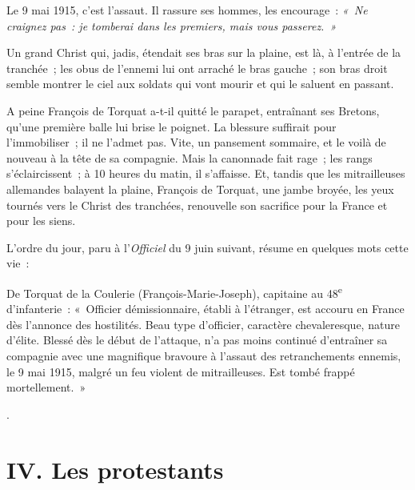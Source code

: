 \documentclass[french,twoside]{book} %
\newcommand\chapteropen{} %
\newcommand\chapterclose{} %
\begin{document}
{ Le 9 mai 1915, c’est l’assaut. Il rassure ses hommes, les encourage : \emph{« Ne craignez pas : je tomberai dans les premiers, mais vous passerez. »}‌\par
 Un grand Christ qui, jadis, étendait ses bras sur la plaine, est là, à l’entrée de la tranchée ; les obus de l’ennemi lui ont arraché le bras gauche ; son bras droit semble montrer le ciel aux soldats qui vont mourir et qui le saluent en passant.‌\par
 A peine François de Torquat a-t-il quitté le parapet, entraînant ses Bretons, qu’une première balle lui brise le poignet. La blessure suffirait pour l’immobiliser ; il ne l’admet pas. Vite, un pansement sommaire, et le voilà de nouveau à la tête de sa compagnie. Mais la canonnade fait rage ; les rangs s’éclaircissent ; à 10 heures du matin, il s’affaisse. Et, tandis que les mitrailleuses allemandes balayent la plaine, François de Torquat, une jambe broyée, les yeux tournés vers le Christ des tranchées, renouvelle son sacrifice pour la France et pour les siens.‌\par
 L’ordre du jour, paru à l’{\itshape Officiel} du 9 juin suivant, résume en quelques mots cette vie :‌\par
  \noindent De Torquat de la Coulerie (François-Marie-Joseph), capitaine au 48\textsuperscript{e} d’infanterie : « Officier démissionnaire, établi à l’étranger, est accouru en France dès l’annonce des hostilités. Beau type d’officier, caractère chevaleresque, nature d’élite. Blessé dès le début de l’attaque, n’a pas moins continué d’entraîner sa compagnie avec une magnifique bravoure à l’assaut des retranchements ennemis, le 9 mai 1915, malgré un feu violent de mitrailleuses. Est tombé frappé mortellement. »
 }.‌
\chapterclose


\chapteropen
\chapter[{IV. Les protestants‌}]{IV. Les protestants‌}\renewcommand{\leftmark}{IV. Les protestants‌}
\end{document}
